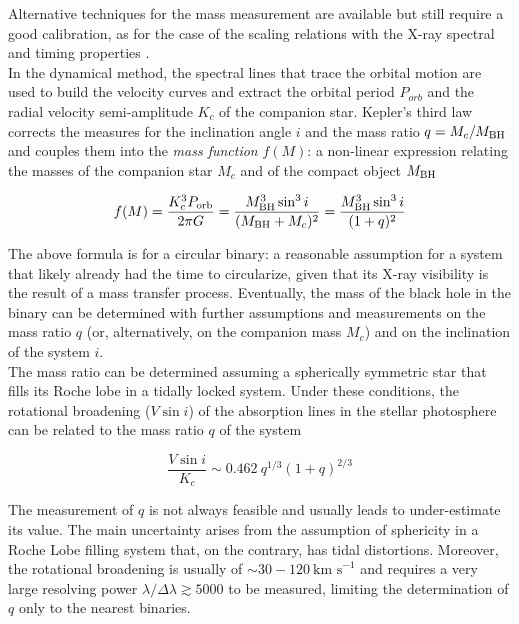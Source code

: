 \documentclass[a4paper,titlepage]{book}     	%
\begin{document}
Alternative techniques for the mass measurement are available but still require a good calibration, as for the case of the scaling relations with the X-ray spectral and timing properties \cite{Xbinaries_massfromXtiming}.\\

In the dynamical method, the spectral lines that trace the orbital motion are used to build the velocity curves and extract the orbital period $P_{orb}$ and the radial velocity semi-amplitude $K_c$ of the companion star. Kepler's third law corrects the measures for the inclination angle $i$ and the mass ratio $q=M_c/M_{\rm BH}$ and couples them into the \emph{mass function} $f(M)$: a non-linear expression relating the masses of the companion star $M_c$ and of the compact object $M_{\rm BH}$

\begin{equation}\label{eq:massfunction}
	f(M) = \frac{K_c^3 P_{\rm orb}}{2 \pi G} = \frac{M_{\rm BH}^3 \sin^3 i}{(M_{\rm BH} + M_c)^2} = \frac{M_{\rm BH}^3 \sin^3 i}{(1+q)^2}
\end{equation}

The above formula is for a circular binary: a reasonable assumption for a system that likely already had the time to circularize, given that its X-ray visibility is the result of a mass transfer process. Eventually, the mass of the black hole in the binary can be determined with further assumptions and measurements on the mass ratio $q$ (or, alternatively, on the companion mass $M_c$) and on the inclination of the system $i$.\\

The mass ratio can be determined assuming a spherically symmetric star that fills its Roche lobe in a tidally locked system. Under these conditions, the rotational broadening ($V \sin i$) of the absorption lines in the stellar photosphere can be related to the mass ratio $q$ of the system \cite{Xbinaries_qmeasure}

\begin{equation}\label{eq:qmeasure}
	\frac{V \sin i}{K_c} \sim 0.462~q^{1/3} (1+q)^{2/3} 
\end{equation}

The measurement of $q$ is not always feasible and usually leads to under-estimate its value. The main uncertainty arises from the assumption of sphericity in a Roche Lobe filling system that, on the contrary, has tidal distortions. Moreover, the rotational broadening is usually of $\sim 30-120~\text{km s}^{-1}$ and requires a very large resolving power $\lambda/\Delta \lambda \gtrsim 5000$ to be measured, limiting the determination of $q$ only to the nearest binaries. 
\end{document}
